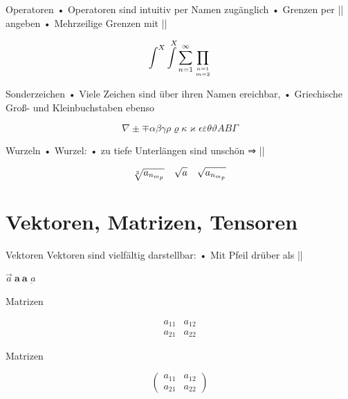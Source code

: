 \begin{frame}[fragile]{Operatoren}
• Operatoren sind intuitiv per Namen zugänglich
• Grenzen per |\limits| angeben
• Mehrzeilige Grenzen mit |\atop|
\•
\begin{LTXexample}
\[\int^X \int\limits^X
\sum_{n=1}^\infty
\prod_{n = 1 \atop m = 2}\]
\end{LTXexample}
\end{frame}

\begin{frame}[fragile]{Sonderzeichen}
• Viele Zeichen sind über ihren Namen ereichbar,
• Griechische Groß- und Kleinbuchstaben ebenso
\•
\begin{LTXexample}
\[\nabla \pm \mp
\alpha \beta \gamma
\rho \varrho \kappa \varkappa
\epsilon \varepsilon \theta \vartheta
A B \Gamma\]
\end{LTXexample}
\end{frame}

\begin{frame}[fragile]{Wurzeln}
• Wurzel:
• zu tiefe Unterlängen sind unschön ⇒ |\smash|
\• 
\begin{LTXexample}[preset=\Large]
\[
\sqrt[3]{a_{n_{m_p}}}
\quad\sqrt{a}\quad
\sqrt{\smash[b]{a_{n_{m_p}}}}
\]
\end{LTXexample}
\end{frame}

\section{Vektoren, Matrizen, Tensoren}
\begin{frame}[fragile]{Vektoren}
Vektoren sind vielfältig darstellbar:
• Mit Pfeil drüber als |\vec|
\•

\begin{LTXexample}
$\vec a\ \pmb a\ \mathbf a$
$\underbar a$
\end{LTXexample}
\end{frame}

\begin{frame}[fragile]{Matrizen}
\begin{LTXexample}
\[\begin{matrix}
a_{11} & a_{12}\\
a_{21} & a_{22}
\end{matrix}\]
\end{LTXexample}
\end{frame}

\begin{frame}[fragile]{Matrizen}
\begin{LTXexample}
\[\left(\begin{matrix}
a_{11} & a_{12}\\
a_{21} & a_{22}
\end{matrix}\right)\]
\end{LTXexample}
\end{frame}

